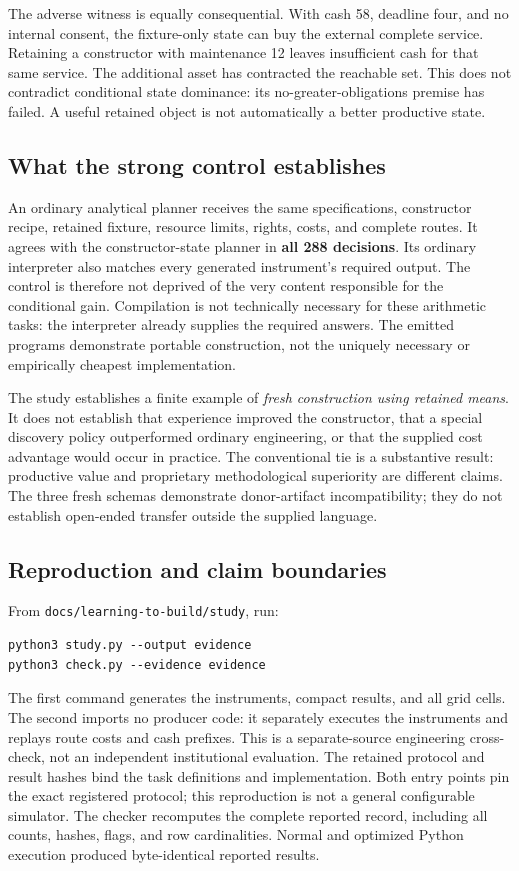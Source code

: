 The adverse witness is equally consequential. With cash 58, deadline four, and
no internal consent, the fixture-only state can buy the external complete service.
Retaining a constructor with maintenance 12 leaves insufficient cash for that
same service. The additional asset has contracted the reachable set. This does
not contradict conditional state dominance: its no-greater-obligations premise
has failed. A useful retained object is not automatically a better productive
state.

\subsection{What the strong control establishes}

An ordinary analytical planner receives the same specifications, constructor
recipe, retained fixture, resource limits, rights, costs, and complete routes. It
agrees with the constructor-state planner in \textbf{all 288 decisions}. Its
ordinary interpreter also matches every generated instrument's required output.
The control is therefore not deprived of the very content responsible for the
conditional gain. Compilation is not technically necessary for these arithmetic
tasks: the interpreter already supplies the required answers. The emitted
programs demonstrate portable construction, not the uniquely necessary or
empirically cheapest implementation.

The study establishes a finite example of \emph{fresh construction using retained
means}. It does not establish that experience improved the constructor, that a
special discovery policy outperformed ordinary engineering, or that the supplied
cost advantage would occur in practice. The conventional tie is a substantive
result: productive value and proprietary methodological superiority are different
claims. The three fresh schemas demonstrate donor-artifact incompatibility; they
do not establish open-ended transfer outside the supplied language.

\subsection{Reproduction and claim boundaries}

From \texttt{docs/learning-to-build/study}, run:
\begin{lstlisting}
python3 study.py --output evidence
python3 check.py --evidence evidence
\end{lstlisting}
The first command generates the instruments, compact results, and all grid cells.
The second imports no producer code: it separately executes the instruments and
replays route costs and cash prefixes. This is a separate-source engineering
cross-check, not an independent institutional evaluation. The retained protocol
and result hashes bind the task definitions and implementation. Both entry
points pin the exact registered protocol; this reproduction is not a general
configurable simulator. The checker recomputes the complete reported record,
including all counts, hashes, flags, and row cardinalities. Normal and
optimized Python execution produced byte-identical reported results.

